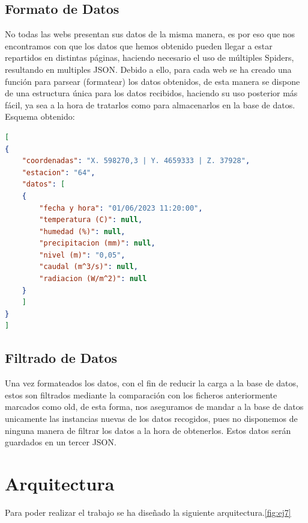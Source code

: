 \subsection{Formato de Datos}
No todas las webs presentan sus datos de la misma manera, es por eso que nos encontramos con que los datos que hemos obtenido pueden llegar a estar repartidos en distintas páginas, haciendo necesario el uso de múltiples Spiders, resultando en multiples JSON.\newline
\newline
Debido a ello, para cada web se ha creado una función para parsear (formatear) los datos obtenidos, de esta manera se dispone de una estructura única para los datos recibidos, haciendo su uso posterior más fácil, ya sea a la hora de tratarlos como para almacenarlos en la base de datos.\newline
\newline
Esquema obtenido:

\begin{lstlisting}[language=json]
[
{
	"coordenadas": "X. 598270,3 | Y. 4659333 | Z. 37928",
	"estacion": "64",
	"datos": [
	{
		"fecha y hora": "01/06/2023 11:20:00",
		"temperatura (C)": null,
		"humedad (%)": null,
		"precipitacion (mm)": null,
		"nivel (m)": "0,05",
		"caudal (m^3/s)": null,
		"radiacion (W/m^2)": null
	}
	]
}
]
\end{lstlisting}

\subsection{Filtrado de Datos}
Una vez formateados los datos, con el fin de reducir la carga a la base de datos, estos son filtrados mediante la comparación con los ficheros anteriormente marcados como old, de esta forma, nos aseguramos de mandar a la base de datos unicamente las instancias nuevas de los datos recogidos, pues no disponemos de ninguna manera de filtrar los datos a la hora de obtenerlos. Estos datos serán guardados en un tercer JSON.

\section{Arquitectura}
Para poder realizar el trabajo se ha diseñado la siguiente arquitectura.\ref{fig:ej7}

